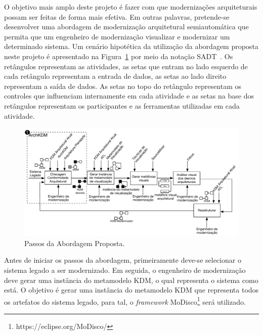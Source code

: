 \documentclass[12pt]{article}
\begin{document}
O objetivo mais amplo deste projeto é fazer com que modernizações arquiteturais possam ser feitas de forma mais efetiva. Em outras palavras, pretende-se desenvolver uma abordagem de modernização arquitetural semiautomática  que permita que um engenheiro de modernização visualizar e modernizar um determinado sistema. %
%
Um cenário hipotética da utilização da abordagem proposta neste projeto é apresentado na Figura~\ref{fig:approach_steps} por meio da notação SADT~\cite{Marcaraf}. Os retângulos representam as atividades, as setas que entram no lado esquerdo de cada retângulo representam a entrada de dados, as setas ao lado direito representam a saída de dados. As setas no topo do retângulo representam os controles que influenciam internamente em cada atividade e as setas na base dos retângulos representam os participantes e as ferramentas utilizadas em cada atividade.

\begin{figure}[htb]
 \label{fig:approach_steps}
 \centering
 \includegraphics[scale=0.6]{projeto_pos_doc_figura5.pdf}
 \caption{Passos da Abordagem Proposta.}
\end{figure}

Antes de iniciar os passos da abordagem, primeiramente deve-se selecionar o sistema legado a ser modernizado. Em seguida, o engenheiro de modernização deve gerar uma instância do metamodelo KDM, o qual representa o sistema como está. O objetivo é gerar uma instância do metamodelo KDM que representa todos os artefatos do sistema legado, para tal, o \textit{framework} MoDisco\footnote{https://eclipse.org/MoDisco/} será utilizado.
\end{document}
